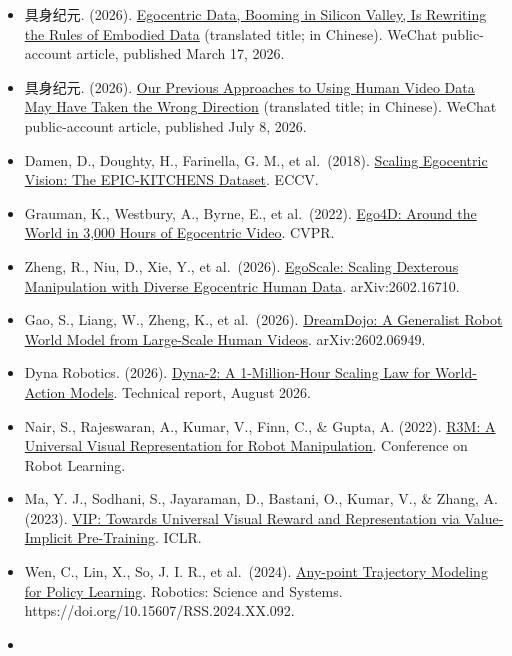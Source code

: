 \vspace{0.25em}
\begin{itemize}
\tightlist
\item
  具身纪元. (2026). \href{https://www.jintiankansha.com/t/rxSAsq869K}{Egocentric Data, Booming in Silicon Valley, Is Rewriting the Rules of Embodied Data} (translated title; in Chinese). WeChat public-account article, published March 17, 2026.
\item
  具身纪元. (2026). \href{https://www.jintiankansha.com/t/PtzdfzjSA4}{Our Previous Approaches to Using Human Video Data May Have Taken the Wrong Direction} (translated title; in Chinese). WeChat public-account article, published July 8, 2026.
\item
  Damen, D., Doughty, H., Farinella, G. M., et al.~(2018). \href{https://arxiv.org/abs/1804.02748}{Scaling Egocentric Vision: The EPIC-KITCHENS Dataset}. ECCV.
\item
  Grauman, K., Westbury, A., Byrne, E., et al.~(2022). \href{https://arxiv.org/abs/2110.07058}{Ego4D: Around the World in 3,000 Hours of Egocentric Video}. CVPR.
\item
  Zheng, R., Niu, D., Xie, Y., et al.~(2026). \href{https://arxiv.org/abs/2602.16710}{EgoScale: Scaling Dexterous Manipulation with Diverse Egocentric Human Data}. arXiv:2602.16710.
\item
  Gao, S., Liang, W., Zheng, K., et al.~(2026). \href{https://arxiv.org/abs/2602.06949}{DreamDojo: A Generalist Robot World Model from Large-Scale Human Videos}. arXiv:2602.06949.
\item
  Dyna Robotics. (2026). \href{https://www.dyna.co/dyna-2}{Dyna-2: A 1-Million-Hour Scaling Law for World-Action Models}. Technical report, August 2026.
\item
  Nair, S., Rajeswaran, A., Kumar, V., Finn, C., \& Gupta, A. (2022). \href{https://arxiv.org/abs/2203.12601}{R3M: A Universal Visual Representation for Robot Manipulation}. Conference on Robot Learning.
\item
  Ma, Y. J., Sodhani, S., Jayaraman, D., Bastani, O., Kumar, V., \& Zhang, A. (2023). \href{https://arxiv.org/abs/2210.00030}{VIP: Towards Universal Visual Reward and Representation via Value-Implicit Pre-Training}. ICLR.
\item
  Wen, C., Lin, X., So, J. I. R., et al.~(2024). \href{https://www.roboticsproceedings.org/rss20/p092.html}{Any-point Trajectory Modeling for Policy Learning}. Robotics: Science and Systems. https://doi.org/10.15607/RSS.2024.XX.092.
\item

\end{itemize}
